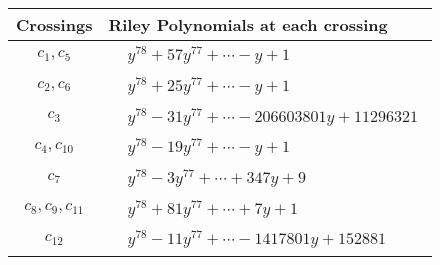 \documentclass[1p]{elsarticle_modified}
\theoremstyle{definition}
\begin{document}
\begin{tabular}{m{50pt}|m{274pt}}
Crossings & \hspace{64pt}Riley Polynomials at each crossing \\
\hline $$\begin{aligned}c_{1},c_{5}\end{aligned}$$&$\begin{aligned}
&y^{78}+57 y^{77}+\cdots- y+1
\end{aligned}$\\
\hline $$\begin{aligned}c_{2},c_{6}\end{aligned}$$&$\begin{aligned}
&y^{78}+25 y^{77}+\cdots- y+1
\end{aligned}$\\
\hline $$\begin{aligned}c_{3}\end{aligned}$$&$\begin{aligned}
&y^{78}-31 y^{77}+\cdots-206603801 y+11296321
\end{aligned}$\\
\hline $$\begin{aligned}c_{4},c_{10}\end{aligned}$$&$\begin{aligned}
&y^{78}-19 y^{77}+\cdots- y+1
\end{aligned}$\\
\hline $$\begin{aligned}c_{7}\end{aligned}$$&$\begin{aligned}
&y^{78}-3 y^{77}+\cdots+347 y+9
\end{aligned}$\\
\hline $$\begin{aligned}c_{8},c_{9},c_{11}\end{aligned}$$&$\begin{aligned}
&y^{78}+81 y^{77}+\cdots+7 y+1
\end{aligned}$\\
\hline $$\begin{aligned}c_{12}\end{aligned}$$&$\begin{aligned}
&y^{78}-11 y^{77}+\cdots-1417801 y+152881
\end{aligned}$\\
\hline
\end{tabular}
\vskip 2pc
\end{document}
